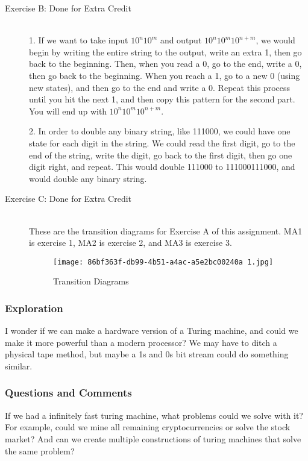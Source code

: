\documentclass{article}
\theoremstyle{theorem}
\theoremstyle{definition}
\theoremstyle{remark}
\begin{document}
\begin{description}
\item[Exercise B: Done for Extra Credit] \textbf{ }\\
1. If we want to take input $10^n10^m$ and output $10^n10^m10^{n+m}$, we would begin by writing the entire string to the output, write an extra 1, then go back to the beginning. Then, when you read a 0, go to the end, write a 0, then go back to the beginning. When you reach a 1, go to a new 0 (using new states), and then go to the end and write a 0. Repeat this process until you hit the next 1, and then copy this pattern for the second part. You will end up with $10^n10^m10^{n+m}$.

2. In order to double any binary string, like 111000, we could have one state for each digit in the string. We could read the first digit, go to the end of the string, write the digit, go back to the first digit, then go one digit right, and repeat. This would double 111000 to 111000111000, and would double any binary string. 

\item[Exercise C: Done for Extra Credit] \textbf{ }\\
These are the transition diagrams for Exercise A of this assignment. MA1 is exercise 1, MA2 is exercise 2, and MA3 is exercise 3.
\begin{figure}[h]
    \centering
    \texttt{[image: 86bf363f-db99-4b51-a4ac-a5e2bc00240a~1.jpg]}
    \caption{Transition Diagrams}
    \label{fig:enter-label}
\end{figure}

\end{description}

\subsubsection{Exploration}
I wonder if we can make a hardware version of a Turing machine, and could we make it more powerful than a modern processor? We may have to ditch a physical tape method, but maybe a 1s and 0s bit stream could do something similar. 

\subsubsection{Questions and Comments}
If we had a infinitely fast turing machine, what problems could we solve with it? For example, could we mine all remaining cryptocurrencies or solve the stock market? And can we create multiple constructions of turing machines that solve the same problem?
\end{document}
